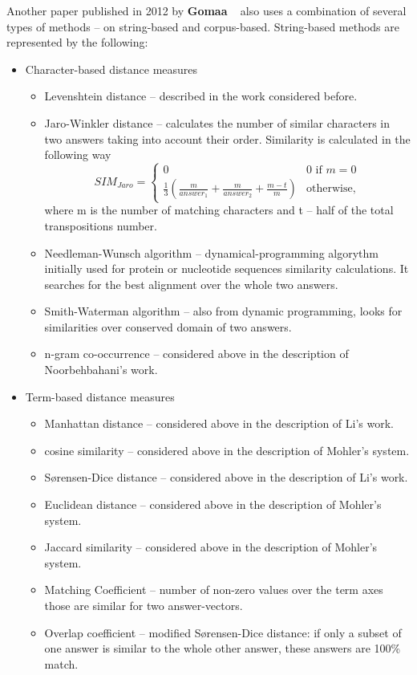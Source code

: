 Another paper published in 2012 by \textbf{Gomaa} ~\cite{Gomaa} also uses a combination of several types of methods -- on string-based and corpus-based. String-based methods are represented by the following:
\begin{itemize}
\item Character-based distance measures
\begin{itemize}
\item Levenshtein distance -- described in the work considered before.
\item Jaro-Winkler distance -- calculates the number of similar characters in two answers taking into account their order. Similarity is calculated in the following way ~\cite{Jaro}
\begin{equation} \label{eq:Jaro}
SIM_{Jaro} = \begin{cases}
   0 &\text{0 if $m = 0$}\\
   \text{$\frac{1}{3}(\frac{m}{answer_1} + \frac{m}{answer_2} + \frac{m - t}{m})$}&\text{otherwise},
 \end{cases}
\end{equation}
where m is the number of matching characters and t -- half of the total transpositions number.
\item Needleman-Wunsch algorithm -- dynamical-programming algorythm initially used for protein or nucleotide sequences similarity calculations. It searches for the best alignment over the whole two answers.
\item Smith-Waterman algorithm -- also from dynamic programming, looks for similarities over conserved domain of two answers. 
\item n-gram co-occurrence -- considered above in the description of Noorbehbahani's work.
\end{itemize}
\item Term-based distance measures
\begin{itemize}
\item Manhattan distance -- considered above in the description of Li's work.
\item cosine similarity -- considered above in the description of Mohler's system.
\item S{\o}rensen-Dice distance -- considered above in the description of Li's work.
\item Euclidean distance -- considered above in the description of Mohler's system.
\item Jaccard similarity -- considered above in the description of Mohler's system.
\item Matching Coefficient -- number of non-zero values over the term axes those are similar for two answer-vectors.
\item Overlap coefficient -- modified S{\o}rensen-Dice distance: if only a subset of one answer is similar to the whole other answer, these answers are 100\% match.
\end{itemize}
\end{itemize}

